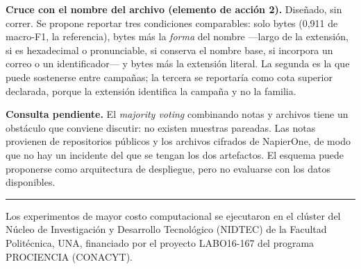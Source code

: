 \documentclass[11pt,a4paper]{article}
\begin{document}
\textbf{Cruce con el nombre del archivo (elemento de acción 2).} Diseñado, sin correr. Se
propone reportar tres condiciones comparables: solo bytes (0,911 de macro-F1, la referencia),
bytes más la \emph{forma} del nombre ---largo de la extensión, si es hexadecimal o pronunciable,
si conserva el nombre base, si incorpora un correo o un identificador--- y bytes más la
extensión literal. La segunda es la que puede sostenerse entre campañas; la tercera se
reportaría como cota superior declarada, porque la extensión identifica la campaña y no la
familia.

\textbf{Consulta pendiente.} El \emph{majority voting} combinando notas y archivos tiene un
obstáculo que conviene discutir: no existen muestras pareadas. Las notas provienen de
repositorios públicos y los archivos cifrados de NapierOne, de modo que no hay un incidente del
que se tengan los dos artefactos. El esquema puede proponerse como arquitectura de despliegue,
pero no evaluarse con los datos disponibles.

\vspace{1em}
\hrule
\vspace{0.5em}
{\footnotesize Los experimentos de mayor costo computacional se ejecutaron en el clúster del
Núcleo de Investigación y Desarrollo Tecnológico (NIDTEC) de la Facultad Politécnica, UNA,
financiado por el proyecto LABO16-167 del programa PROCIENCIA (CONACYT).}
\end{document}
